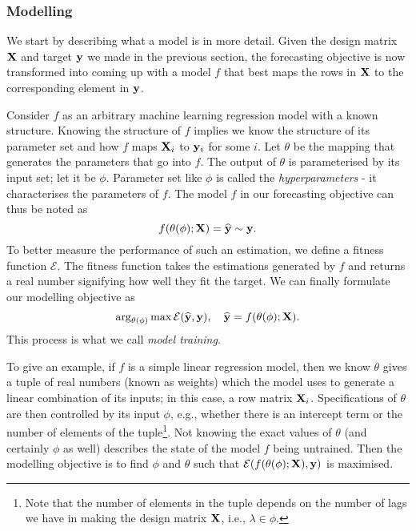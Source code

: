 \subsubsection{Modelling}
We start by describing what a model is in more detail. Given the design matrix $\mathbf{X}$ and target $\mathbf{y}$ we made in the previous section, the forecasting objective is now transformed into coming up with a model $f$ that best maps the rows in $\mathbf{X}$ to the corresponding element in $\mathbf{y}$.

Consider $f$ as an arbitrary machine learning regression model with a known structure. Knowing the structure of $f$ implies we know the structure of its parameter set and how $f$ maps $\mathbf{X}_i$ to $\mathbf{y}_i$ for some $i$. Let $\theta$ be the mapping that generates the parameters that go into $f$. The output of $\theta$ is parameterised by its input set; let it be $\phi$. Parameter set like $\phi$ is called the \textit{hyperparameters} - it characterises the parameters of $f$. The model $f$ in our forecasting objective can thus be noted as
\begin{equation*}
    f(\theta(\phi); \mathbf{X}) = \widehat{\mathbf{y}} \sim \mathbf{y}.
\end{equation*}
To better measure the performance of such an estimation, we define a fitness function $\mathcal{E}$. The fitness function takes the estimations generated by $f$ and returns a real number signifying how well they fit the target. We can finally formulate our modelling objective as
\begin{equation}\label{eq: ml training}
    \arg_{\theta(\phi)} \max \mathcal{E}(\widehat{\mathbf{y}}, \mathbf{y}), \quad \widehat{\mathbf{y}} = f(\theta(\phi); \mathbf{X}).
\end{equation}
This process is what we call \textit{model training}.

To give an example, if $f$ is a simple linear regression model, then we know $\theta$ gives a tuple of real numbers (known as weights) which the model uses to generate a linear combination of its inputs; in this case, a row matrix $\mathbf{X}_i$. Specifications of $\theta$ are then controlled by its input $\phi$, e.g., whether there is an intercept term or the number of elements of the tuple\footnote{Note that the number of elements in the tuple depends on the number of lags we have in making the design matrix $\mathbf{X}$, i.e., $\lambda \in \phi$.}. Not knowing the exact values of $\theta$ (and certainly $\phi$ as well) describes the state of the model $f$ being untrained. Then the modelling objective is to find $\phi$ and $\theta$ such that $\mathcal{E}(f(\theta(\phi); \mathbf{X}), \mathbf{y})$ is maximised.


